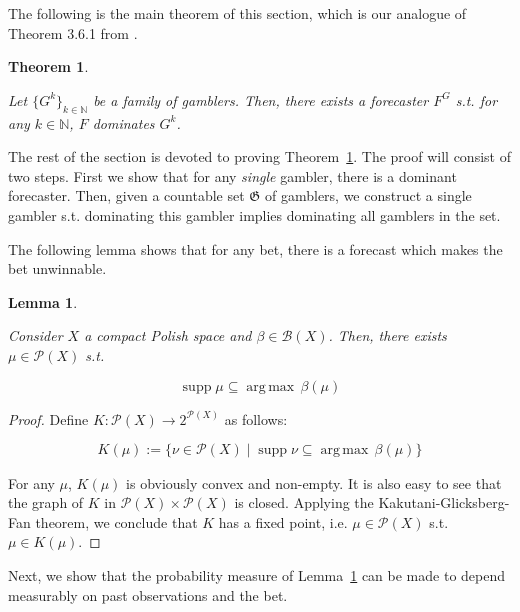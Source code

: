 \documentclass[11pt]{article}
\theoremstyle{definition}
\theoremstyle{plain}
\newtheorem{theorem}{Theorem}%
\newtheorem{lemma}{Lemma}%
\newcommand{\Nats}{\mathbb{N}}
\newcommand{\Argmax}[1]{\underset{#1}{\operatorname{arg\,max}}\,}
\newcommand{\Sq}[2]{\{#1\}_{#2 \in \Nats}}
\newcommand{\PM}{\mathcal{P}}
\DeclareMathOperator{\Sp}{supp}
\newcommand{\Gm}{\mathcal{B}}
\newcommand{\GC}{\mathfrak{G}}
\begin{document}
The following is the main theorem of this section, which is our analogue of Theorem 3.6.1 from \cite{Garrabrant_2016}.

\begin{theorem}
\label{thm:exist_dominant}

Let $\Sq{G^k}{k}$ be a family of gamblers. Then, there exists a forecaster $F^G$ s.t. for any $k \in \Nats$, $F$ dominates $G^k$.

\end{theorem}

The rest of the section is devoted to proving Theorem~\ref{thm:exist_dominant}. The proof will consist of two steps. First we show that for any \emph{single} gambler, there is a dominant forecaster. Then, given a countable set $\GC$ of gamblers, we construct a single gambler s.t. dominating this gambler implies dominating all gamblers in the set.

The following lemma shows that for any bet, there is a forecast which makes the bet unwinnable.

\begin{lemma}
\label{lmm:unwinnable}

Consider $X$ a compact Polish space and $\beta \in \Gm\left(X\right)$. Then, there exists $\mu \in \PM\left(X\right)$ s.t.

\begin{equation}
\Sp \mu \subseteq \Argmax{} \beta\left(\mu\right)
\end{equation}

\end{lemma}

\begin{proof}

Define ${K: \PM\left(X\right) \rightarrow 2^{\PM\left(X\right)}}$ as follows:

\[K\left(\mu\right):=\{\nu \in \PM\left(X\right) \mid \Sp{\nu} \subseteq \Argmax{}{\beta\left(\mu\right)}\}\]

For any ${\mu}$, ${K}\left(\mu\right)$ is obviously convex and non-empty. It is also easy to see that the graph of $K$ in $\PM\left(X\right) \times \PM\left(X\right)$ is closed. Applying the Kakutani-Glicksberg-Fan theorem, we conclude that $K$ has a fixed point, i.e. $\mu \in \PM\left(X\right)$ s.t. $\mu \in K\left(\mu\right)$.
\end{proof}

Next, we show that the probability measure of Lemma~\ref{lmm:unwinnable} can be made to depend measurably on past observations and the bet.
\end{document}
